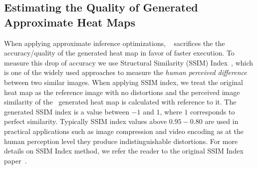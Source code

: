 \subsection{Estimating the Quality of Generated Approximate Heat Maps}

When applying approximate inference optimizations, \system~ sacrifices the the accuracy/quality of the generated heat map in favor of faster execution.
To measure this drop of accuracy we use Structural Similarity (SSIM) Index~\cite{wang2004image}, which is one of the widely used approaches to measure the \textit{human perceived difference} between two similar images.
When applying SSIM index, we treat the original heat map as the reference image with no distortions and the perceived image similarity of the \system~generated heat map is calculated with reference to it.
The generated SSIM index is a value between $-1$ and $1$, where $1$ corresponds to perfect similarity.
Typically SSIM index values above $0.95-0.80$ are used in practical applications such as image compression and video encoding as at the human perception level they produce indistinguishable distortions.
For more details on SSIM Index method, we refer the reader to the original SSIM Index paper~\cite{wang2004image}.

